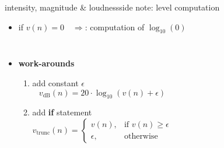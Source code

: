         \begin{frame}{intensity, magnitude \& loudness}{side note: level computation}
            \begin{itemize}
                \item[] if $v(n) = 0\quad\Rightarrow$: computation of $\log_{10}(0)$
            \end{itemize}
            \begin{columns}
            \begin{itemize}
                \item<2-> \textbf{work-arounds}
                    \begin{enumerate}[a]
                        \item	add constant $\epsilon$
                            \begin{equation*}
                                v_\mathrm{dB}(n) = 20\cdot\log_{10}(v(n) + \epsilon)
                            \end{equation*}

                        \item<3->	add \textbf{if} statement	
                            \begin{equation*}
                                v_\mathrm{trunc}(n)  =   \left\{ 
                                            \begin{array}{ll} 
                                                v(n), & \text{if } v(n) \geq \epsilon \\
                                                \epsilon, & \text{otherwise }
                                            \end{array} 
                                            \right. 
                            \end{equation*}
                    \end{enumerate}
            \end{itemize}
            \end{columns}
        \end{frame}
        
